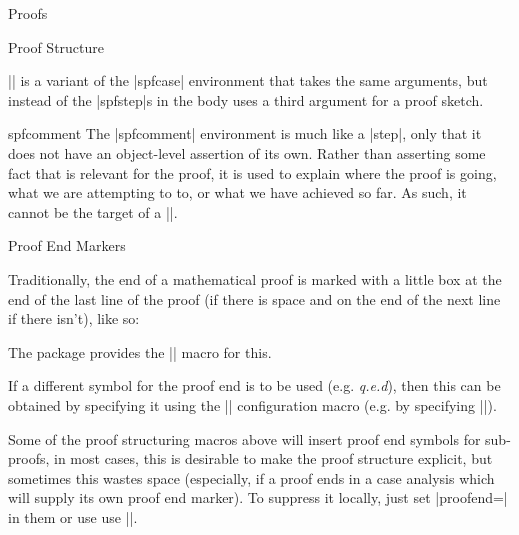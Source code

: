 \begin{sfragment}{Proofs}
\begin{sfragment}{Proof Structure}
  \begin{function}{\spfcasesketch}
    |\spfcasesketch| is a variant of the |spfcase| environment that takes the same
    arguments, but instead of the |spfstep|s in the body uses a third argument for a proof
    sketch.
  \end{function}
  
  \begin{environment}{spfcomment}
    The |spfcomment| environment is much like a |step|, only that it does not have an
    object-level assertion of its own. Rather than asserting some fact that is relevant
    for the proof, it is used to explain where the proof is going, what we are attempting
    to to, or what we have achieved so far. As such, it cannot be the target of a
    |\premise|.
  \end{environment}
\end{sfragment}

\begin{sfragment}{Proof End Markers}

\begin{function}{\sproofend}
  Traditionally, the end of a mathematical proof is marked with a little box at the end of
  the last line of the proof (if there is space and on the end of the next line if there
  isn't), like so:\sproofend

  The  package provides the |\sproofend| macro for this.
\end{function}
  
\begin{variable}{\sProofEndSymbol}
  If a different symbol for the proof end is to be used (e.g. {\sl{q.e.d}}), then this can
  be obtained by specifying it using the |\sProofEndSymbol| configuration macro (e.g. by
  specifying ||).
\end{variable}

  
Some of the proof structuring macros above will insert proof end symbols for sub-proofs,
in most cases, this is desirable to make the proof structure explicit, but sometimes this
wastes space (especially, if a proof ends in a case analysis which will supply its own
proof end marker). To suppress it locally, just set |proofend={}| in them or use use
|\sProofEndSymbol{}|.
\end{sfragment}
\end{sfragment}



